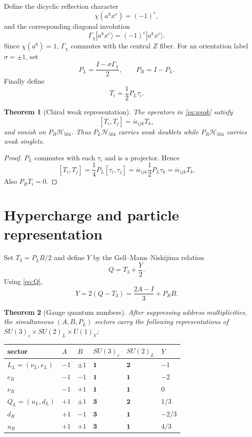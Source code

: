 \documentclass[11pt]{article}
\newtheorem{theorem}{Theorem}[section]
\theoremstyle{definition}\newtheorem{definition}[theorem]{Definition}
\theoremstyle{remark}\newtheorem{remark}[theorem]{Remark}
\begin{document}
Define the dicyclic reflection character
\[
\chi(a^kx^e)=(-1)^e,
\]
and the corresponding diagonal involution
\[
\Gamma_\chi|a^kx^e\rangle=(-1)^e|a^kx^e\rangle.
\]
Since $\chi(a^6)=1$, $\Gamma_\chi$ commutes with the central $Z$ fiber.  For an orientation label $\sigma=\pm1$, set
\[
P_L=\frac{I-\sigma\Gamma_\chi}{2},
\qquad P_R=I-P_L.
\]
Finally define
\begin{equation}
\label{eq:weak}
T_i=\frac12P_L\tau_i.
\end{equation}

\begin{theorem}[Chiral weak representation]
The operators in \eqref{eq:weak} satisfy
\[
[T_i,T_j]=i\epsilon_{ijk}T_k,
\]
and vanish on $P_R\mathcal H_{504}$.  Thus $P_L\mathcal H_{504}$ carries weak doublets while $P_R\mathcal H_{504}$ carries weak singlets.
\end{theorem}
\begin{proof}
$P_L$ commutes with each $\tau_i$ and is a projector. Hence
\[
[T_i,T_j]=\frac14P_L[\tau_i,\tau_j]
=i\epsilon_{ijk}\frac12P_L\tau_k=i\epsilon_{ijk}T_k.
\]
Also $P_RT_i=0$.
\end{proof}

\section{Hypercharge and particle representation}
Set $T_3=P_LB/2$ and define $Y$ by the Gell--Mann--Nishijima relation
\[
Q=T_3+\frac Y2.
\]
Using \eqref{eq:Q},
\begin{equation}
\label{eq:Y}
Y=2(Q-T_3)=\frac{2A-I}{3}+P_RB.
\end{equation}

\begin{theorem}[Gauge quantum numbers]
After suppressing address multiplicities, the simultaneous $(A,B,P_L)$ sectors carry the following representations of
$SU(3)_c\times SU(2)_L\times U(1)_Y$:
\end{theorem}

\begin{center}
\begin{tabular}{@{}llllll@{}}
\toprule
sector & $A$ & $B$ & $SU(3)_c$ & $SU(2)_L$ & $Y$ \\
\midrule
$L_L=(\nu_L,e_L)$ & $-1$ & $\pm1$ & $\mathbf1$ & $\mathbf2$ & $-1$ \\
$e_R$ & $-1$ & $-1$ & $\mathbf1$ & $\mathbf1$ & $-2$ \\
$\nu_R$ & $-1$ & $+1$ & $\mathbf1$ & $\mathbf1$ & $0$ \\
$Q_L=(u_L,d_L)$ & $+1$ & $\pm1$ & $\mathbf3$ & $\mathbf2$ & $1/3$ \\
$d_R$ & $+1$ & $-1$ & $\mathbf3$ & $\mathbf1$ & $-2/3$ \\
$u_R$ & $+1$ & $+1$ & $\mathbf3$ & $\mathbf1$ & $4/3$ \\
\bottomrule
\end{tabular}
\end{center}
\end{document}
